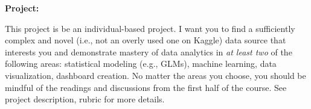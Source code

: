 \documentclass[11pt]{article}\usepackage[]{graphicx}\usepackage[]{color}
\begin{document}
 \vspace{1cm}


\textbf {\large Project:}

This project is be an individual-based project. I want you to find a sufficiently complex and novel (i.e., not an overly used one on Kaggle) data source that interests you and demonstrate mastery of data analytics in \textit{at least two} of the following areas: statistical modeling (e.g., GLMs), machine learning, data visualization, dashboard creation. No matter the areas you choose, you should be mindful of the readings and discussions from the first half of the course. See project description, rubric for more details.
\vspace{.25cm}
\end{document}
